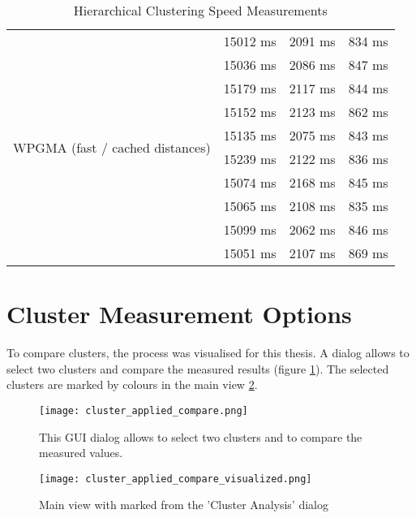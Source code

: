 \begin{table}[!ht]
\begin{tabular}{ | l | l | l | l | }
        \multirow{10}{*}{\begin{minipage}{3cm}WPGMA (fast / cached distances)\end{minipage}}
        & 15012 ms & 2091 ms & 834 ms \\
        & 15036 ms & 2086 ms & 847 ms \\
        & 15179 ms & 2117 ms & 844 ms \\
        & 15152 ms & 2123 ms & 862 ms \\
        & 15135 ms & 2075 ms & 843 ms \\
        & 15239 ms & 2122 ms & 836 ms \\
        & 15074 ms & 2168 ms & 845 ms \\
        & 15065 ms & 2108 ms & 835 ms \\
        & 15099 ms & 2062 ms & 846 ms \\
        & 15051 ms & 2107 ms & 869 ms \\
        \hline
    \end{tabular}
    \caption{Hierarchical Clustering Speed Measurements}
    \label{tab:speed_measurements_hierarchical_clustering}
\end{table}

\pagebreak
\section{Cluster Measurement Options} \label{sec:cluster_measurement_options}
To compare clusters, the process was visualised for this thesis. A dialog allows to select two clusters and compare the measured results (figure \ref{fig:applied_clustering_analysis_GUI}). The selected clusters are marked by colours in the main view \ref{fig:applied_clustering_analysis_visualized_GUI}.

\begin{figure}[ht]
    \centering
    \texttt{[image: cluster\_applied\_compare.png]}
    \caption{This \gls{GUI} dialog allows to select two clusters and to compare the measured values.}
    \label{fig:applied_clustering_analysis_GUI}
\end{figure}

\begin{figure}[ht]
    \centering
    \begin{mdframed}[style=border]
        \texttt{[image: cluster\_applied\_compare\_visualized.png]}
    \end{mdframed}
    \caption{Main view with marked from the 'Cluster Analysis' dialog}
    \label{fig:applied_clustering_analysis_visualized_GUI}
\end{figure}

